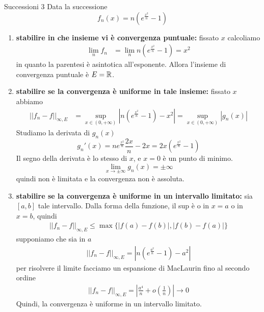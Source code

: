 \documentclass[a4paper]{article}
\begin{document}
\pagebreak

\begin{snippetexercise}{Successioni 3}
    Data la successione
    \[
        f_n(x) = n\left(e^{\frac{x^2}{n}} - 1\right)
    \]
    \begin{enumerate}
        \item \textbf{stabilire in che insieme vi è convergenza puntuale:} fissato \(x\) calcoliamo
        \begin{align*}
            \lim_n f_n &= \lim_n n\left(e^{\frac{x^2}{n}} - 1\right) = x^2
        \end{align*}
        in quanto la parentesi è asintotica all'esponente. Allora l'insieme di convergenza puntuale è \(E = \mathbb{R}\).
        \item \textbf{stabilire se la convergenza è uniforme in tale insieme:} fissato \(x\) abbiamo
        \begin{align*}
            {||f_n - f||}_{\infty, E} &= \sup_{x\in (0, +\infty)} \left|
                n\left(e^{\frac{x^2}{n}} - 1\right) - x^2
            \right| = \sup_{x\in (0, +\infty)} \left|
                g_n(x)
            \right|
        \end{align*}
        Studiamo la derivata di \(g_n(x)\)
        \[
            g_n'(x) = ne^{\frac{x^2}{n}}\frac{2x}{n} - 2x = 2x\left(
                e^{\frac{x^2}{n}} - 1
            \right)
        \]
        Il segno della derivata è lo stesso di \(x\), e \(x=0\) è un punto di minimo.
        \[
            \lim_{x\to\pm\infty} g_n(x) = \pm\infty
        \]
        quindi non è limitata e la convergenza non è assoluta.
        \item \textbf{stabilire se la convergenza è uniforme in un intervallo limitato:} sia \([a,b]\) tale intervallo.
        Dalla forma della funzione, il sup è o in \(x=a\) o in \(x=b\), quindi
        \begin{align*}
            ||f_n - f||_{\infty, E} \leq \max\{|f(a)-f(b)|, |f(b)-f(a)|\}
        \end{align*}
        supponiamo che sia in \(a\)
        \begin{align*}
            ||f_n - f||_{\infty, E} = \left|n\left(e^{\frac{a^2}{n}} - 1\right) - a^2\right|
        \end{align*}
        per risolvere il limite facciamo un espansione di MacLaurin fino al secondo ordine
        \begin{align*}
            ||f_n - f||_{\infty, E} = \left|
                \frac{a^4}{n} + o\left(\frac{1}{n}\right)
            \right| \to 0
        \end{align*}
        Quindi, la convergenza è uniforme in un intervallo limitato.
    \end{enumerate}
\end{snippetexercise}
\end{document}
